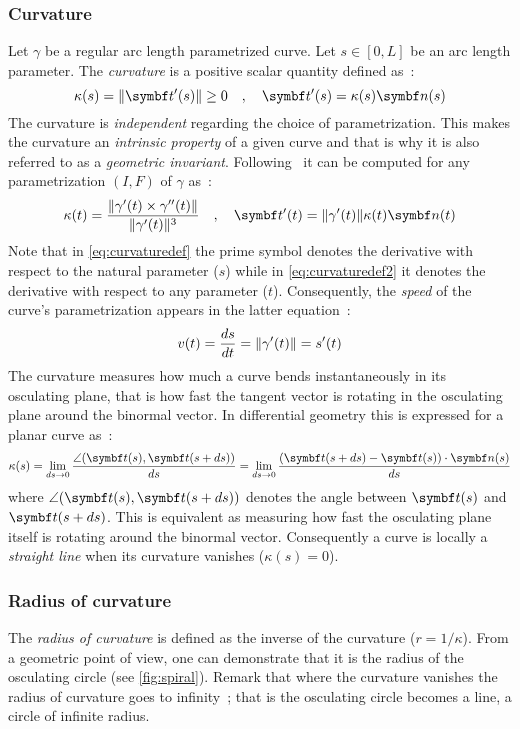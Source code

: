 \subsubsection{Curvature}
Let $\gamma$ be a regular arc length parametrized curve. Let $s \in [0,L]$ be an arc length parameter. The \emph{curvature} is a positive scalar quantity defined as~:
\begin{equation}
	\kappa(s) = \norm{\vect{t}'(s)} \ge 0 
	\quad,\quad
	\vect{t}'(s) = \kappa(s) \vect{n}(s)
\label{eq:curvaturedef}
\end{equation}
The curvature is \emph{independent} regarding the choice of parametrization. This makes the curvature an \emph{intrinsic property} of a given curve and that is why it is also referred to as a \emph{geometric invariant}. Following~\cite[pp.203-204]{Gray2006} it can be computed for any parametrization $(I,F)$ of $\gamma$ as~:
\begin{equation}
	\kappa(t) = \frac{\norm{\gamma'(t) \times \gamma''(t)}}{\norm{\gamma'(t)}^3}
	\quad,\quad
	\vect{t}'(t) = \norm{\gamma'(t)} \kappa(t) \vect{n}(t)
\label{eq:curvaturedef2}
\end{equation}
Note that in \cref{eq:curvaturedef} the prime symbol denotes the derivative with respect to the natural parameter ($s$) while in \cref{eq:curvaturedef2} it denotes the derivative with respect to any parameter ($t$). Consequently, the \emph{speed} of the curve's parametrization appears in the latter equation~:
\begin{equation}
	v(t) = \frac{ds}{dt} = \lVert\gamma'(t)\rVert = s'(t)
\end{equation}
The curvature measures how much a curve bends instantaneously in its osculating plane, that is how fast the tangent vector is rotating in the osculating plane around the binormal vector. In differential geometry this is expressed for a planar curve as~:
\begin{equation}
	\kappa(s)
	= \lim_{ds \to 0}\frac{\angle(\vect{t}(s),\vect{t}(s+ds))}{ds}
	= \lim_{ds \to 0}\frac{(\vect{t}(s+ds) - \vect{t}(s)) \cdot \vect{n}(s)}{ds}
\end{equation}
where $\angle(\vect{t}(s),\vect{t}(s+ds))$ denotes the angle between $\vect{t}(s)$ and $\vect{t}(s+ds)$. This is equivalent as measuring how fast the osculating plane itself is rotating around the binormal vector. Consequently a curve is locally a \emph{straight line} when its curvature vanishes ($\kappa(s)= 0$).

\subsubsection{Radius of curvature}
The \emph{radius of curvature} is defined as the inverse of the curvature ($r= 1/\kappa$). From a geometric point of view, one can demonstrate that it is the radius of the osculating circle (see \cref{fig:spiral}). Remark that where the curvature vanishes the radius of curvature goes to infinity~; that is the osculating circle becomes a line, a circle of infinite radius.

